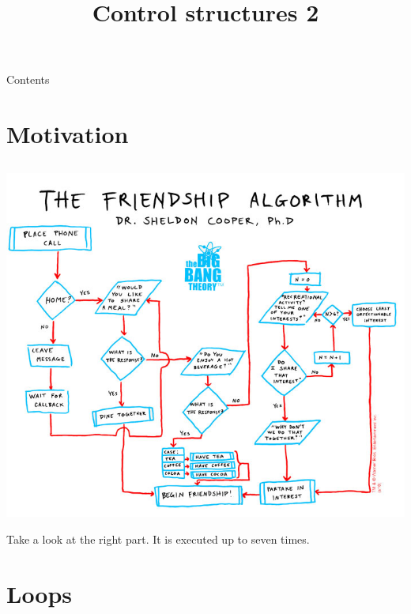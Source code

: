 
\newcommand{\topic}{
	Control structures 2
}
\usepackage{tikz}
\title{\topic}
\supertitle{\course}
\date{}



\maketitle

\begin{frame}{Contents}
	\tableofcontents
\end{frame}

\section{Motivation}
\subsection{}
\begin{frame}
	\centerline{\includegraphics[scale=.32]{../img/friendship.jpg}}
	\bigskip
	Take a look at the right part. It is executed up to seven times.
\end{frame}

\section{Loops}
